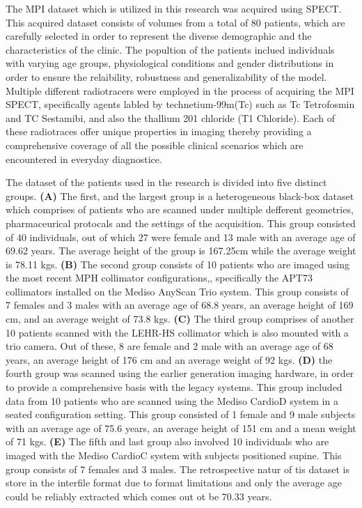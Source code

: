 The MPI dataset which is utilized in this research was acquired using SPECT. This acquired dataset consists of volumes from a total of 80 patients, which are carefully selected in order to represent the diverse demographic and the characteristics of the clinic. The popultion of the patients inclued individuals with varying age groups, physiological conditions and gender distributions in order to ensure the relaibility, robustness and generalizability of the model. Multiple different radiotracers were employed in the process of acquiring the MPI SPECT, specifically agents labled by technetium-99m(Tc) such as Tc Tetrofosmin and TC Sestamibi, and also the thallium 201 chloride (T1 Chloride). Each of these radiotraces offer unique properties in imaging thereby providing a comprehensive coverage of all the possible clinical scenarios which are encountered in everyday diagnostice. 

The dataset of the patients used in the research is divided into five distinct groups. \textbf{(A)} The first, and the largest group is a heterogeneous black-box dataset which comprises of patients who are scanned under multiple defferent geometries, pharmaceurical protocals and the settings of the acquisition. This group consisted of 40 individuals, out of which 27 were female and 13 male with an average age of 69.62 years. The average height of the group is 167.25cm while the average weight is 78.11 kgs. \textbf{(B)} The second group consists of 10 patients who are imaged using the most recent MPH collimator configurations,, specifically the APT73 collimators installed on the Mediso AnyScan Trio system. This group consists of 7 females and 3 males with an average age of 68.8 years, an average height of 169 cm, and an average weight of 73.8 kgs. \textbf{(C)} The third group comprises of another 10 patients scanned with the LEHR-HS collimator which is also mounted with a trio camera. Out of these, 8 are female and 2 male with an average age of 68 years, an average height of 176 cm and an average weight of 92 kgs. \textbf{(D)} the fourth group was scanned using the earlier generation imaging hardware, in order to provide a comprehensive basis with the legacy systems. This group included data from 10 patients who are scanned using the Mediso CardioD system in a seated configuration setting. This group consisted of 1 female and 9 male subjects with an average age of 75.6 years, an average height of 151 cm and a mean weight of 71 kgs. \textbf{(E)} The fifth and last group also involved 10 individuals who are imaged with the Mediso CardioC system with subjects positioned supine. This group consists of 7 females and 3 males. The retrospective natur of tis dataset is store in the interfile format due to format limitations and only the average age could be reliably extracted which comes out ot be 70.33 years.

